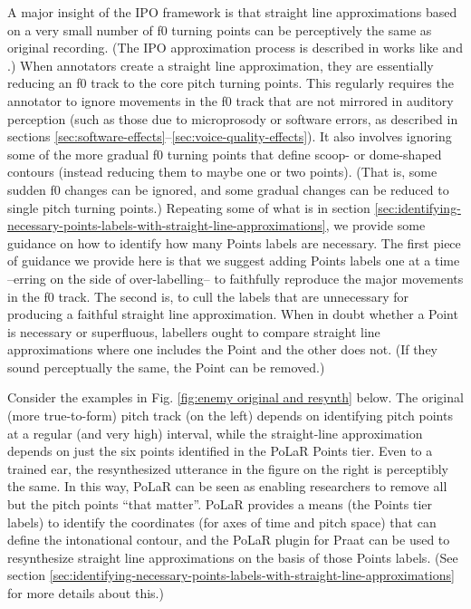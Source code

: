 A major insight of the IPO framework is that straight line approximations based on a very small number of f0 turning points can be perceptively the same as original recording. (The IPO approximation process is described in works like \citealt{dutoit97} and \citealt{rao12}.) When annotators create a straight line approximation, they are essentially reducing an f0 track to the core pitch turning points. This regularly requires the annotator to ignore movements in the f0 track that are not mirrored in auditory perception (such as those due to microprosody or software errors, as described in sections \ref{sec:software-effects}–\ref{sec:voice-quality-effects}). It also involves ignoring some of the more gradual f0 turning points that define scoop- or dome-shaped contours (instead reducing them to maybe one or two points). (That is, some sudden f0 changes can be ignored, and some gradual changes can be reduced to single pitch turning points.) Repeating some of what is in section \ref{sec:identifying-necessary-points-labels-with-straight-line-approximations}, we provide some guidance on how to identify how many Points labels are necessary. The first piece of guidance we provide here is that we suggest adding Points labels one at a time –erring on the side of over-labelling– to faithfully reproduce the major movements in the f0 track. The second is, to cull the labels that are unnecessary for producing a faithful straight line approximation. When in doubt whether a Point is necessary or superfluous, labellers ought to compare straight line approximations where one includes the Point and the other does not. (If they sound perceptually the same, the Point can be removed.) 

Consider the examples in Fig. \ref{fig:enemy original and resynth} below. The original (more true-to-form) pitch track (on the left) depends on identifying pitch points at a regular (and very high) interval, while the straight-line approximation depends on just the six points identified in the PoLaR Points tier. Even to a trained ear, the resynthesized utterance in the figure on the right is perceptibly the same. In this way, PoLaR can be seen as enabling researchers to remove all but the pitch points “that matter”. PoLaR provides a means (the Points tier labels) to identify the coordinates (for axes of time and pitch space) that can define the intonational contour, and the PoLaR plugin for Praat can be used to resynthesize straight line approximations on the basis of those Points labels. (See section \ref{sec:identifying-necessary-points-labels-with-straight-line-approximations} for more details about this.)

